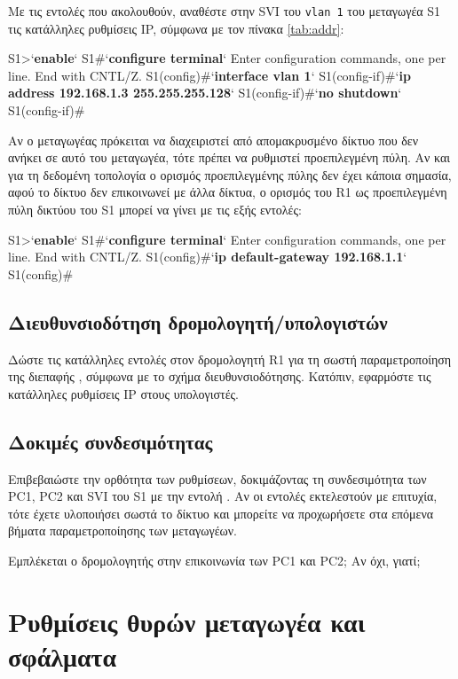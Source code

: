 \documentclass{EdipyLabs} %
\begin{document}
Με τις εντολές που ακολουθούν, αναθέστε στην SVI του \texttt{vlan 1} του μεταγωγέα S1 τις κατάλληλες ρυθμίσεις IP, σύμφωνα με τον πίνακα \ref{tab:addr}:

\begin{CommandBox}
S1>`\textbf{enable}`
S1#`\textbf{configure terminal}`
Enter configuration commands, one per line.  End with CNTL/Z.
S1(config)#`\textbf{interface vlan 1}`
S1(config-if)#`\textbf{ip address 192.168.1.3 255.255.255.128}`
S1(config-if)#`\textbf{no shutdown}`
S1(config-if)#
\end{CommandBox}

Αν ο μεταγωγέας πρόκειται να διαχειριστεί από απομακρυσμένο δίκτυο που δεν ανήκει σε αυτό του μεταγωγέα, τότε πρέπει να ρυθμιστεί προεπιλεγμένη πύλη. Αν και για τη δεδομένη τοπολογία ο ορισμός προεπιλεγμένης πύλης δεν έχει κάποια σημασία, αφού το δίκτυο δεν επικοινωνεί με άλλα δίκτυα, ο ορισμός του R1 ως προεπιλεγμένη πύλη δικτύου του S1 μπορεί να γίνει με τις εξής εντολές:

\begin{CommandBox}
S1>`\textbf{enable}`
S1#`\textbf{configure terminal}`
Enter configuration commands, one per line.  End with CNTL/Z.
S1(config)#`\textbf{ip default-gateway 192.168.1.1}`
S1(config)#
\end{CommandBox}

\subsection{Διευθυνσιοδότηση δρομολογητή/υπολογιστών}
Δώστε τις κατάλληλες εντολές στον δρομολογητή R1  για τη σωστή παραμετροποίηση της διεπαφής , σύμφωνα με το σχήμα διευθυνσιοδότησης. Κατόπιν, εφαρμόστε τις κατάλληλες ρυθμίσεις IP στους υπολογιστές.

\subsection{Δοκιμές συνδεσιμότητας}
Επιβεβαιώστε την ορθότητα των ρυθμίσεων, δοκιμάζοντας τη συνδεσιμότητα των PC1, PC2 και SVI του S1 με την εντολή . Αν οι εντολές εκτελεστούν με επιτυχία, τότε έχετε υλοποιήσει σωστά το δίκτυο και μπορείτε να προχωρήσετε στα επόμενα βήματα παραμετροποίησης των μεταγωγέων.

\begin{questionbox}
	Εμπλέκεται ο δρομολογητής στην επικοινωνία των PC1 και PC2; Αν όχι, γιατί;
\end{questionbox}

\section{Ρυθμίσεις θυρών μεταγωγέα και σφάλματα}
\end{document}
